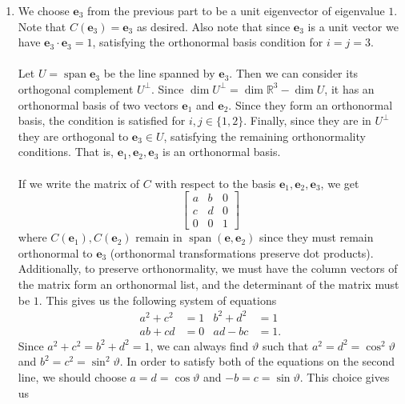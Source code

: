 \documentclass[12 pt, letterpaper]{hmcpset}
\begin{document}
\begin{solution}
\begin{enumerate}
		\item We choose $\mathbf{e}_{3}$ from the previous part to be a unit eigenvector of eigenvalue $1$. Note that $C(\mathbf{e}_{3}) = \mathbf{e}_{3}$ as desired. Also note that since $\mathbf{e}_{3}$ is a unit vector we have $\mathbf{e}_{3} \cdot \mathbf{e}_{3} = 1$, satisfying the orthonormal basis condition for $i = j = 3$. \\\\ 
			Let $U = \operatorname{span} \mathbf{e}_{3}$ be the line spanned by $\mathbf{e}_{3}$. Then we can consider its orthogonal complement $U^{\perp}$. Since $\operatorname{dim} U^{\perp} = \operatorname{dim} \mathbb{R}^{3} - \operatorname{dim} U$, it has an orthonormal basis of two vectors $\mathbf{e}_{1}$ and $\mathbf{e}_{2}$. Since they form an orthonormal basis, the condition is satisfied for $i, j \in \{ 1, 2 \}$. Finally, since they are in $U^{\perp}$ they are orthogonal to $\mathbf{e}_{3} \in U$, satisfying the remaining orthonormality conditions. That is, $\mathbf{e}_{1}, \mathbf{e}_{2}, \mathbf{e}_{3}$ is an orthonormal basis. \\\\
			If we write the matrix of $C$ with respect to the basis $\mathbf{e}_{1}, \mathbf{e}_{2}, \mathbf{e}_{3}$, we get
			\[
				\begin{bmatrix}
					a & b & 0 \\
					c & d & 0 \\
					0 & 0 & 1
				\end{bmatrix}
			\]
			where $C(\mathbf{e}_{1}), C(\mathbf{e}_{2})$ remain in $\operatorname{span}(\mathbf{e}, \mathbf{e}_{2})$ since they must remain orthonormal to $\mathbf{e}_{3}$ (orthonormal transformations preserve dot products). Additionally, to preserve orthonormality, we must have the column vectors of the matrix form an orthonormal list, and the determinant of the matrix must be $1$. This gives us the following system of equations
			\[
				\begin{aligned}
					a^{2} + c^{2} & = 1 & b^{2} + d^{2} & = 1 \\
					ab + cd & = 0 & ad - bc & = 1.
				\end{aligned}
			\]
			Since $a^{2} + c^{2} = b^{2} + d^{2} = 1$, we can always find $\vartheta$ such that $a^{2} = d^{2} = \cos^{2}{\vartheta}$ and $b^{2} = c^{2} = \sin^{2}{\vartheta}$. In order to satisfy both of the equations on the second line, we should choose $a = d = \cos{\vartheta}$ and $-b = c = \sin{\vartheta}$. This choice gives us
			\[
				\begin{split}

\end{split}\]
\end{enumerate}
\end{solution}
\end{document}

